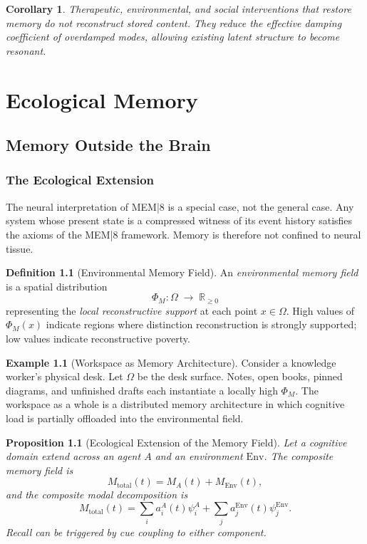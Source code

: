 \documentclass[12pt, oneside]{book}
\theoremstyle{plain}
\newtheorem{proposition}[theorem]{Proposition}
\newtheorem{corollary}[theorem]{Corollary}
\theoremstyle{definition}
\newtheorem{definition}[theorem]{Definition}
\newtheorem{example}[theorem]{Example}
\theoremstyle{remark}
\newcommand{\RR}{\mathbb{R}}
\begin{document}
\begin{corollary}
Therapeutic, environmental, and social interventions
that restore memory do not reconstruct stored content.
They reduce the effective damping coefficient of
overdamped modes, allowing existing latent structure
to become resonant.
\end{corollary}

\part{Ecological Memory}

\chapter{Memory Outside the Brain}

\section{The Ecological Extension}

The neural interpretation of MEM|8 is a special case,
not the general case.
Any system whose present state is a compressed witness
of its event history satisfies the axioms of the
MEM|8 framework.
Memory is therefore not confined to neural tissue.

\begin{definition}[Environmental Memory Field]
\label{def:env-mem}
An \emph{environmental memory field} is a spatial
distribution
\[
  \Phi_M : \Omega \;\longrightarrow\; \RR_{\geq 0}
\]
representing the \emph{local reconstructive support}
at each point $x \in \Omega$.
High values of $\Phi_M(x)$ indicate regions where
distinction reconstruction is strongly supported;
low values indicate reconstructive poverty.
\end{definition}

\begin{example}[Workspace as Memory Architecture]
Consider a knowledge worker's physical desk.
Let $\Omega$ be the desk surface.
Notes, open books, pinned diagrams, and unfinished
drafts each instantiate a locally high $\Phi_M$.
The workspace as a whole is a distributed memory architecture
in which cognitive load is partially offloaded into the
environmental field.
\end{example}

\begin{proposition}[Ecological Extension of the Memory Field]
Let a cognitive domain extend across an agent $A$ and
an environment $\mathrm{Env}$.
The composite memory field is
\[
  M_{\text{total}}(t) = M_A(t) + M_{\mathrm{Env}}(t),
\]
and the composite modal decomposition is
\[
  M_{\text{total}}(t) = \sum_i a_i^A(t)\psi_i^A
                        + \sum_j a_j^{\mathrm{Env}}(t)\psi_j^{\mathrm{Env}}.
\]
Recall can be triggered by cue coupling to either
component.
\end{proposition}
\end{document}
